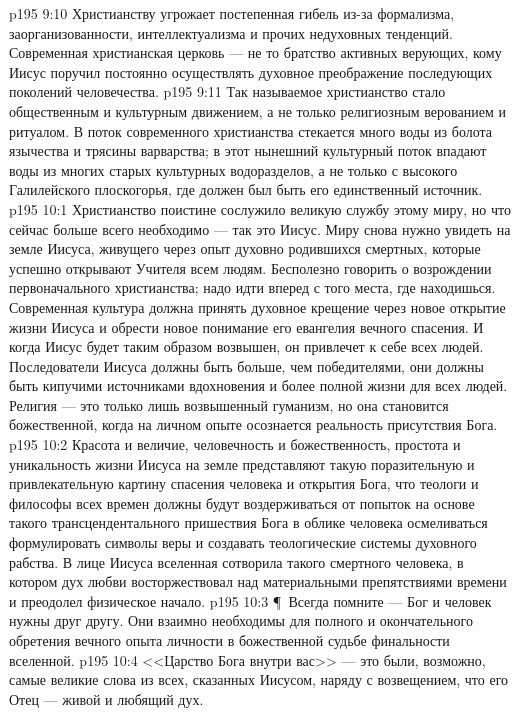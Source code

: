 \vs p195 9:10 Христианству угрожает постепенная гибель из\hyp{}за формализма, заорганизованности, интеллектуализма и прочих недуховных тенденций. Современная христианская церковь --- не то братство активных верующих, кому Иисус поручил постоянно осуществлять духовное преображение последующих поколений человечества.
\vs p195 9:11 Так называемое христианство стало общественным и культурным движением, а не только религиозным верованием и ритуалом. В поток современного христианства стекается много воды из болота язычества и трясины варварства; в этот нынешний культурный поток впадают воды из многих старых культурных водоразделов, а не только с высокого Галилейского плоскогорья, где должен был быть его единственный источник.
\vs p195 10:1 Христианство поистине сослужило великую службу этому миру, но что сейчас больше всего необходимо --- так это Иисус. Миру снова нужно увидеть на земле Иисуса, живущего через опыт духовно родившихся смертных, которые успешно открывают Учителя всем людям. Бесполезно говорить о возрождении первоначального христианства; надо идти вперед с того места, где находишься. Современная культура должна принять духовное крещение через новое открытие жизни Иисуса и обрести новое понимание его евангелия вечного спасения. И когда Иисус будет таким образом возвышен, он привлечет к себе всех людей. Последователи Иисуса должны быть больше, чем победителями, они должны быть кипучими источниками вдохновения и более полной жизни для всех людей. Религия --- это только лишь возвышенный гуманизм, но она становится божественной, когда на личном опыте осознается реальность присутствия Бога.
\vs p195 10:2 Красота и величие, человечность и божественность, простота и уникальность жизни Иисуса на земле представляют такую поразительную и привлекательную картину спасения человека и открытия Бога, что теологи и философы всех времен должны будут воздерживаться от попыток на основе такого трансцендентального пришествия Бога в облике человека осмеливаться формулировать символы веры и создавать теологические системы духовного рабства. В лице Иисуса вселенная сотворила такого смертного человека, в котором дух любви восторжествовал над материальными препятствиями времени и преодолел физическое начало.
\vs p195 10:3 \P\ Всегда помните --- Бог и человек нужны друг другу. Они взаимно необходимы для полного и окончательного обретения вечного опыта личности в божественной судьбе финальности вселенной.
\vs p195 10:4 <<Царство Бога внутри вас>> --- это были, возможно, самые великие слова из всех, сказанных Иисусом, наряду с возвещением, что его Отец --- живой и любящий дух.
